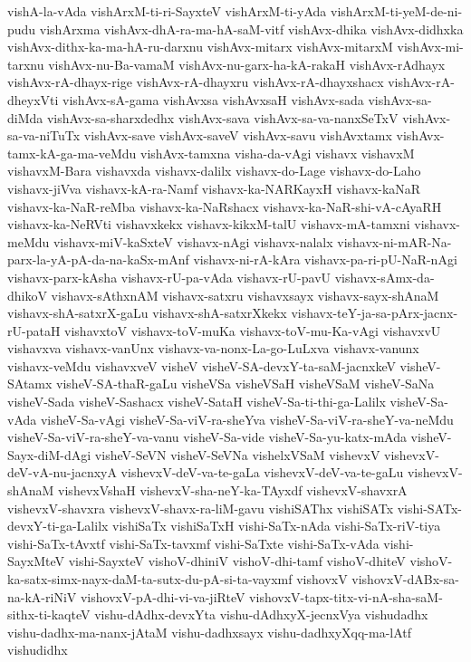 {vishA-la-vAda
vishArxM-ti-ri-SayxteV
vishArxM-ti-yAda
vishArxM-ti-yeM-de-ni-pudu
vishArxma
vishAvx-dhA-ra-ma-hA-saM-vitf
vishAvx-dhika
vishAvx-didhxka
vishAvx-dithx-ka-ma-hA-ru-darxnu
vishAvx-mitarx
vishAvx-mitarxM
vishAvx-mi-tarxnu
vishAvx-nu-Ba-vamaM
vishAvx-nu-garx-ha-kA-rakaH
vishAvx-rAdhayx
vishAvx-rA-dhayx-rige
vishAvx-rA-dhayxru
vishAvx-rA-dhayxshacx
vishAvx-rA-dheyxVti
vishAvx-sA-gama
vishAvxsa
vishAvxsaH
vishAvx-sada
vishAvx-sa-diMda
vishAvx-sa-sharxdedhx
vishAvx-sava
vishAvx-sa-va-nanxSeTxV
vishAvx-sa-va-niTuTx
vishAvx-save
vishAvx-saveV
vishAvx-savu
vishAvxtamx
vishAvx-tamx-kA-ga-ma-veMdu
vishAvx-tamxna
visha-da-vAgi
vishavx
vishavxM
vishavxM-Bara
vishavxda
vishavx-dalilx
vishavx-do-Lage
vishavx-do-Laho
vishavx-jiVva
vishavx-kA-ra-Namf
vishavx-ka-NARKayxH
vishavx-kaNaR
vishavx-ka-NaR-reMba
vishavx-ka-NaRshacx
vishavx-ka-NaR-shi-vA-cAyaRH
vishavx-ka-NeRVti
vishavxkekx
vishavx-kikxM-talU
vishavx-mA-tamxni
vishavx-meMdu
vishavx-miV-kaSxteV
vishavx-nAgi
vishavx-nalalx
vishavx-ni-mAR-Na-parx-la-yA-pA-da-na-kaSx-mAnf
vishavx-ni-rA-kAra
vishavx-pa-ri-pU-NaR-nAgi
vishavx-parx-kAsha
vishavx-rU-pa-vAda
vishavx-rU-pavU
vishavx-sAmx-da-dhikoV
vishavx-sAthxnAM
vishavx-satxru
vishavxsayx
vishavx-sayx-shAnaM
vishavx-shA-satxrX-gaLu
vishavx-shA-satxrXkekx
vishavx-teY-ja-sa-pArx-jacnx-rU-pataH
vishavxtoV
vishavx-toV-muKa
vishavx-toV-mu-Ka-vAgi
vishavxvU
vishavxva
vishavx-vanUnx
vishavx-va-nonx-La-go-LuLxva
vishavx-vanunx
vishavx-veMdu
vishavxveV
visheV
visheV-SA-devxY-ta-saM-jacnxkeV
visheV-SAtamx
visheV-SA-thaR-gaLu
visheVSa
visheVSaH
visheVSaM
visheV-SaNa
visheV-Sada
visheV-Sashacx
visheV-SataH
visheV-Sa-ti-thi-ga-Lalilx
visheV-Sa-vAda
visheV-Sa-vAgi
visheV-Sa-viV-ra-sheYva
visheV-Sa-viV-ra-sheY-va-neMdu
visheV-Sa-viV-ra-sheY-va-vanu
visheV-Sa-vide
visheV-Sa-yu-katx-mAda
visheV-Sayx-diM-dAgi
visheV-SeVN
visheV-SeVNa
vishelxVSaM
vishevxV
vishevxV-deV-vA-nu-jacnxyA
vishevxV-deV-va-te-gaLa
vishevxV-deV-va-te-gaLu
vishevxV-shAnaM
vishevxVshaH
vishevxV-sha-neY-ka-TAyxdf
vishevxV-shavxrA
vishevxV-shavxra
vishevxV-shavx-ra-liM-gavu
vishiSAThx
vishiSATx
vishi-SATx-devxY-ti-ga-Lalilx
vishiSaTx
vishiSaTxH
vishi-SaTx-nAda
vishi-SaTx-riV-tiya
vishi-SaTx-tAvxtf
vishi-SaTx-tavxmf
vishi-SaTxte
vishi-SaTx-vAda
vishi-SayxMteV
vishi-SayxteV
vishoV-dhiniV
vishoV-dhi-tamf
vishoV-dhiteV
vishoV-ka-satx-simx-nayx-daM-ta-sutx-du-pA-si-ta-vayxmf
vishovxV
vishovxV-dABx-sa-na-kA-riNiV
vishovxV-pA-dhi-vi-va-jiRteV
vishovxV-tapx-titx-vi-nA-sha-saM-sithx-ti-kaqteV
vishu-dAdhx-devxYta
vishu-dAdhxyX-jecnxVya
vishudadhx
vishu-dadhx-ma-nanx-jAtaM
vishu-dadhxsayx
vishu-dadhxyXqq-ma-lAtf
vishudidhx
}
